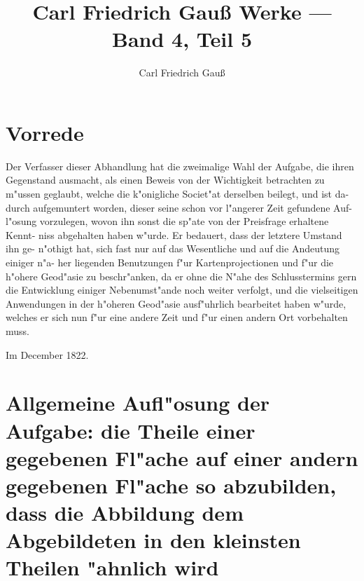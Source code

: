 \documentclass[12pt,a4paper]{article}
\title{Carl Friedrich Gau\ss{} Werke --- Band 4, Teil 5}
\author{Carl Friedrich Gau\ss}
\date{}
\begin{document}
\maketitle
\thispagestyle{empty}


\section*{Vorrede}

Der Verfasser dieser Abhandlung hat die zweimalige Wahl der Aufgabe, die
ihren Gegenstand ausmacht, als einen Beweis von der Wichtigkeit betrachten zu
m"ussen geglaubt, welche die k"onigliche Societ"at derselben beilegt, und ist da-
durch aufgemuntert worden, dieser seine schon vor l"angerer Zeit gefundene Auf-
l"osung vorzulegen, wovon ihn sonst die sp"ate von der Preisfrage erhaltene Kennt-
niss abgehalten haben w"urde. Er bedauert, dass der letztere Umstand ihn ge-
n"othigt hat, sich fast nur auf das Wesentliche und auf die Andeutung einiger n"a-
her liegenden Benutzungen f"ur Kartenprojectionen und f"ur die h"ohere Geod"asie
zu beschr"anken, da er ohne die N"ahe des Schlusstermins gern die Entwicklung
einiger Nebenumst"ande noch weiter verfolgt, und die vielseitigen Anwendungen
in der h"oheren Geod"asie ausf"uhrlich bearbeitet haben w"urde, welches er sich nun
f"ur eine andere Zeit und f"ur einen andern Ort vorbehalten muss.

\begin{flushright}
Im December 1822.
\end{flushright}

\newpage

\section*{Allgemeine Aufl"osung der Aufgabe: die Theile einer gegebenen Fl"ache auf einer andern gegebenen Fl"ache so abzubilden, dass die Abbildung dem Abgebildeten in den kleinsten Theilen "ahnlich wird}
\end{document}
